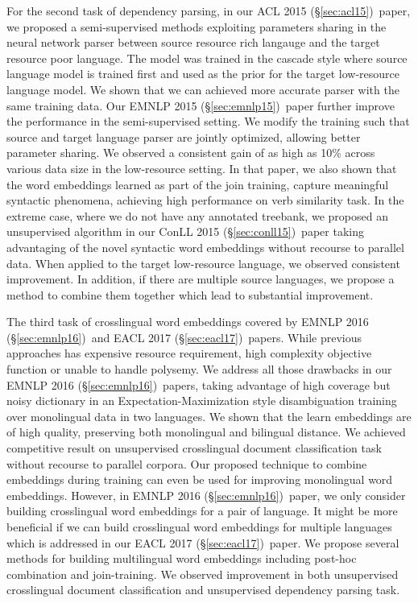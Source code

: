 \documentclass[12pt,twoside,final,hidelinks]{ltthesis}
\theoremstyle{definition}
\newcommand\conllv{ConLL 2015 (\S\ref{sec:conll15})}
\newcommand\aclv{ACL 2015 (\S\ref{sec:acl15})}
\newcommand\emnlpv{EMNLP 2015 (\S\ref{sec:emnlp15})}
\newcommand\emnlpvi{EMNLP 2016 (\S\ref{sec:emnlp16})}
\newcommand\eaclvii{EACL 2017 (\S\ref{sec:eacl17})}
\begin{document}
For the second task of dependency parsing, in our \aclv\ paper, we proposed a semi-supervised methods exploiting parameters sharing in the 
neural network parser between source resource rich langauge and the target resource poor language. The model was trained in the cascade style 
where source language model is trained first and used as the prior for the target low-resource language model. We shown that we can achieved 
more accurate parser with the same training data. Our \emnlpv\ paper further improve the performance in the semi-supervised setting. We modify 
the training such that source and target language parser are jointly optimized, allowing better parameter sharing. We observed a consistent gain
of as high as 10\% across various data size in the low-resource setting. In that paper, we also shown that the word embeddings learned as part 
of the join training, capture meaningful syntactic phenomena, achieving high performance on verb similarity task. In the extreme case, where 
we do not have any annotated treebank, we proposed an unsupervised algorithm in our \conllv\ paper taking advantaging of the novel syntactic word 
embeddings without recourse to parallel data. When applied to the target low-resource language, we observed consistent improvement. In addition, 
if there are multiple source languages, we propose a method to combine them together which lead to substantial improvement. 

The third task of crosslingual word embeddings covered by \emnlpvi\ and \eaclvii\ papers. While previous approaches has expensive resource requirement, 
high complexity objective function or unable to handle polysemy. We address all those drawbacks in our \emnlpvi\ papers, taking advantage of high 
coverage but noisy dictionary in an Expectation-Maximization style disambiguation training over monolingual data in two languages. We shown that the 
learn embeddings are of high quality, preserving both monolingual and bilingual distance. We achieved competitive result on unsupervised crosslingual 
document classification task without recourse to parallel corpora. Our proposed technique to combine embeddings during training can even be used for 
improving monolingual word embeddings. However, in \emnlpvi\ paper, we only consider building crosslingual word embeddings for a pair of language. 
It might be more beneficial if we can build crosslingual word embeddings for multiple languages which is addressed in our \eaclvii\ paper. We propose
several methods for building multilingual word embeddings including post-hoc combination and join-training. We observed improvement in both unsupervised 
crosslingual document classification and unsupervised dependency parsing task. 
\end{document}
